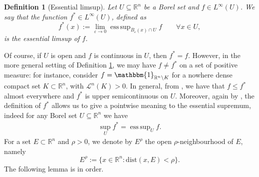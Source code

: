 \documentclass[a4paper,11pt]{article}
\numberwithin{equation}{section}
\newtheorem{Definition}[Theorem]{Definition}
\newcommand{\numberset}{\mathbb}
\newcommand{\eps}{\varepsilon}
\newcommand{\R}{\numberset{R}}
\DeclareMathOperator*{\esssup}{ess\,sup}
\theoremstyle{definition}
\begin{document}
\begin{Definition}[Essential limsup]\label{ess limsup}
Let $U\subseteq\R^n$ be a Borel set and $f\in L^\infty(U)$. We say that the function $f^*\in L^\infty(U)$, defined as
$$
f^*(x):=\lim_{\eps\to0}\esssup_{B_\eps(x)\cap U}f\qquad\forall x\in U,
$$
is the essential limsup of $f$.
\end{Definition}
Of course, if $U$ is open and $f$ is continuous in $U$, then $f^*=f$. 
However, in the more general setting of Definition \ref{ess limsup}, we may have $f\neq f^*$ on a set of positive measure: for instance, consider $f=\mathbbm{1}_{\R^n\setminus K}$ for a nowhere dense compact set $K\subset\R^n$, with $\mathscr L^n(K)>0$. In general, from \cite[Proposition 9]{KSIAM}, we have that $f\leq f^*$ almost everywhere and $f^*$ is upper semicontinuous on $U$. Moreover, again by \cite[Proposition 9]{KSIAM}, the definition of $f^*$ allows us to give a pointwise meaning to the essential supremum, indeed for any Borel set $U\subseteq\R^n$ we have
\begin{align}\label{pointwise sup}
\sup_U f^*=\esssup_U f.
\end{align}
For a set $E\subset\R^n$ and $\rho>0$, we denote by $E^\rho$ the open $\rho$-neighbourhood of $E$, namely $$E^\rho:=\{x\in\R^n: \mathrm{dist}(x, E)<\rho\}.$$
The following lemma is in order.
\end{document}
